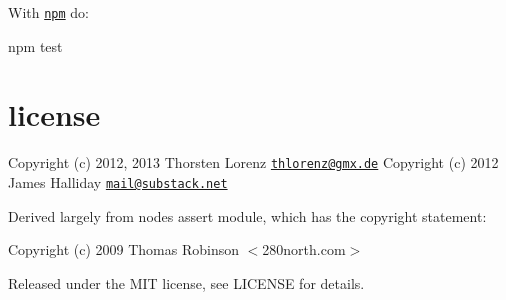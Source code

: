 With \href{http://npmjs.org}{\tt npm} do\+:


\begin{DoxyCode}
npm test
\end{DoxyCode}


\section*{license }

Copyright (c) 2012, 2013 Thorsten Lorenz \href{mailto:thlorenz@gmx.de}{\tt thlorenz@gmx.\+de} Copyright (c) 2012 James Halliday \href{mailto:mail@substack.net}{\tt mail@substack.\+net}

Derived largely from node\textquotesingle{}s assert module, which has the copyright statement\+:

Copyright (c) 2009 Thomas Robinson $<$280north.\+com$>$

Released under the M\+IT license, see L\+I\+C\+E\+N\+SE for details. 